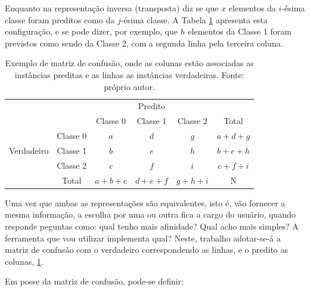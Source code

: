 Enquanto na representação inversa (transposta) diz se que $x$ elementos da $i$-ésima classe foram preditos como da $j$-ésima classe. A Tabela \ref{tab:mc2} apresenta esta configuração, e se pode dizer, por exemplo, que $h$ elementos da Classe 1 foram previstos como sendo da Classe 2, com a segunda linha pela terceira coluna.

\begin{table}[hhh]
\begin{tabular}{l|l|c|c|c|c}
\multicolumn{2}{c}{}&\multicolumn{3}{c}{Predito}&\\ \cline{3-5}
\multicolumn{2}{c|}{}&Classe 0& Classe 1 & Classe 2&\multicolumn{1}{c}{Total}\\ \cline{2-5}
\multirow{3}{*}{Verdadeiro}& Classe 0 & $a$ & $d$ & $g$ & $a+d+g$\\ \cline{2-5}
                           & Classe 1 & $b$ & $e$ & $h$ & $b+e+h$\\ \cline{2-5}
                           & Classe 2 & $c$ & $f$ & $i$ & $c+f+i$\\ \cline{2-5}
\multicolumn{1}{c}{} & \multicolumn{1}{c}{Total} & \multicolumn{1}{c}{$a+b+c$} & \multicolumn{    1}{c}{$d+e+f$} & \multicolumn{1}{c}{$g+h+i$} & \multicolumn{1}{c}{N}\\
\end{tabular}
\caption{Exemplo de matriz de confusão, onde as colunas estão associadas as instâncias preditas e as linhas as instâncias verdadeiras. Fonte: próprio autor.}
\label{tab:mc2}
\end{table}

Uma vez que ambas as representações são equivalentes, isto é, vão fornecer a mesma informação, a escolha por uma ou outra fica a cargo do usuário, quando responde peguntas como: qual tenho mais afinidade? Qual acho mais simples? A ferramenta que vou utilizar implementa qual? Neste, trabalho adotar-se-á a matriz de confusão com o verdadeiro correspondendo as linhas, e o predito as colunas, \ref{tab:mc2}.

Em posse da matriz de confusão, pode-se definir:

